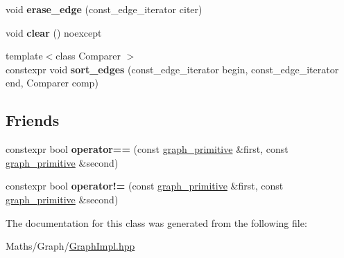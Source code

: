 \begin{DoxyCompactItemize}
\item 
\mbox{\label{classsequoia_1_1maths_1_1graph__primitive_ae7f32aa03de23d5218719ef2d5d5aef2}} 
void {\bfseries erase\+\_\+edge} (const\+\_\+edge\+\_\+iterator citer)
\item 
\mbox{\label{classsequoia_1_1maths_1_1graph__primitive_a25d336e899f392297b103c8ada988287}} 
void {\bfseries clear} () noexcept
\item 
\mbox{\label{classsequoia_1_1maths_1_1graph__primitive_abd685fa53183f904e92e1a6b5f6234b2}} 
{\footnotesize template$<$class Comparer $>$ }\\constexpr void {\bfseries sort\+\_\+edges} (const\+\_\+edge\+\_\+iterator begin, const\+\_\+edge\+\_\+iterator end, Comparer comp)
\end{DoxyCompactItemize}
\subsection*{Friends}
\begin{DoxyCompactItemize}
\item 
\mbox{\label{classsequoia_1_1maths_1_1graph__primitive_ab685124cf16425888d50b8c1aef8ce47}} 
constexpr bool {\bfseries operator==} (const \mbox{\hyperlink{classsequoia_1_1maths_1_1graph__primitive}{graph\+\_\+primitive}} \&first, const \mbox{\hyperlink{classsequoia_1_1maths_1_1graph__primitive}{graph\+\_\+primitive}} \&second)
\item 
\mbox{\label{classsequoia_1_1maths_1_1graph__primitive_abfde4ebc61fd9e49b6ff499661df9d50}} 
constexpr bool {\bfseries operator!=} (const \mbox{\hyperlink{classsequoia_1_1maths_1_1graph__primitive}{graph\+\_\+primitive}} \&first, const \mbox{\hyperlink{classsequoia_1_1maths_1_1graph__primitive}{graph\+\_\+primitive}} \&second)
\end{DoxyCompactItemize}


The documentation for this class was generated from the following file\+:\begin{DoxyCompactItemize}
\item 
Maths/\+Graph/\mbox{\hyperlink{_graph_impl_8hpp}{Graph\+Impl.\+hpp}}\end{DoxyCompactItemize}
